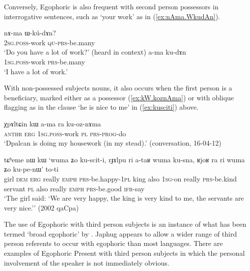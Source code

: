 Conversely, Egophoric is also frequent with second person possessors in interrogative sentences, such as  `your work' as in (\ref{ex:nAma.WkudAn}).

\begin{exe} 
	\ex 
	\begin{xlist}
		\ex \label{ex:nAma.WkudAn}
		\gll nɤ-ma ɯ-kú-dɤn? \\
		\textsc{2sg}.\textsc{poss}-work \textsc{qu}-\textsc{prs}-be.many \\
		\glt `Do you have a lot of work?' (heard in context)
		\ex \label{ex:ama.kudAn}
		\gll a-ma ku-dɤn \\
		\textsc{1sg}.\textsc{poss}-work \textsc{prs}-be.many \\
		\glt `I have a lot of work.' 
	\end{xlist}
\end{exe} 

With non-possessed subjects nouns, it also occurs when the first person is a beneficiary, marked either as a possessor (\ref{ex:kW.koznAma}) or with oblique flagging as in the clause  `he is nice to me' in (\ref{ex:kusciti}) above.

\begin{exe}
	\ex \label{ex:kW.koznAma}
	\gll χpɤltɕin kɯ a-ma ra ku-oz-nɤma \\
	\textsc{anthr} \textsc{erg} \textsc{1sg}.\textsc{poss}-work \textsc{pl} \textsc{prs}-\textsc{prog}-do \\
	\glt `Dpalcan is doing my housework (in my stead).' (conversation, 16-04-12)
\end{exe}

\begin{exe}
	\ex \label{ex:kusciti}
	\gll tɕʰeme nɯ kɯ `wuma ʑo ku-scit-i, rɟɤlpu ri a-taʁ wuma ku-sna, ʁjoʁ ra ri wuma ʑo ku-pe-nɯ' to-ti\\
	girl \textsc{dem} \textsc{erg} really \textsc{emph} \textsc{prs}-be.happy-\textsc{1pl}  king also \textsc{1sg}-on really \textsc{prs}-be.kind servant \textsc{pl} also really \textsc{emph}   \textsc{prs}-be.good \textsc{ifr}-say\\
	\glt `The girl said: `We are very happy, the king is very kind to me, the servants are very nice.'' (2002 qaCpa)
\end{exe}

The use of Egophoric with third person subjects is an instance of what has been termed `broad egophoric' by \citep[89]{gawne17bodish}. Japhug appears to allow a wider range of third person referents to occur with egophoric than most languages. There are examples of Egophoric Present with third person subjects in which the personal involvement of the speaker is not immediately obvious.




